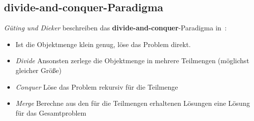 \subsection{divide-and-conquer-Paradigma}

\textit{Güting und Dieker} beschreiben das \textbf{divide-and-conquer}-Paradigma in~\cite[174]{GD18e}:
\begin{itemize}
    \item Ist die Objektmenge klein genug, löse das Problem direkt.
    \item \textit{Divide} Ansonsten zerlege die Objektmenge in mehrere Teilmengen (möglichst gleicher Größe)
    \item \textit{Conquer} Löse das Problem rekursiv für die Teilmenge
    \item \textit{Merge} Berechne aus den für die Teilmengen erhaltenen Lösungen eine Lösung für das Gesamtproblem
\end{itemize}